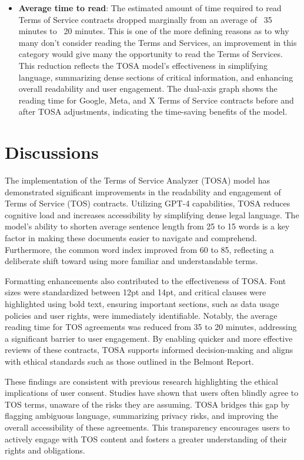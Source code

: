 \documentclass[sigconf, nonacm]{acmart}
\begin{document}
\begin{itemize}
\item \textbf{Average time to read}: The estimated amount of time required to read Terms of Service contracts dropped marginally from an average of ~35 minutes to ~20 minutes. This is one of the more defining reasons as to why many don't consider reading the Terms and Services, an improvement in this category would give many the opportunity to read the Terms of Services. This reduction reflects the TOSA model's effectiveness in simplifying language, summarizing dense sections of critical information, and enhancing overall readability and user engagement. The dual-axis graph shows the reading time for Google, Meta, and X Terms of Service contracts before and after TOSA adjustments, indicating the time-saving benefits of the model.
\end{itemize}

\section{Discussions}
The implementation of the Terms of Service Analyzer (TOSA) model has demonstrated significant improvements in the readability and engagement of Terms of Service (TOS) contracts. Utilizing GPT-4 capabilities, TOSA reduces cognitive load and increases accessibility by simplifying dense legal language. The model’s ability to shorten average sentence length from 25 to 15 words is a key factor in making these documents easier to navigate and comprehend. Furthermore, the common word index improved from 60 to 85, reflecting a deliberate shift toward using more familiar and understandable terms.

Formatting enhancements also contributed to the effectiveness of TOSA. Font sizes were standardized between 12pt and 14pt, and critical clauses were highlighted using bold text, ensuring important sections, such as data usage policies and user rights, were immediately identifiable. Notably, the average reading time for TOS agreements was reduced from 35 to 20 minutes, addressing a significant barrier to user engagement. By enabling quicker and more effective reviews of these contracts, TOSA supports informed decision-making and aligns with ethical standards such as those outlined in the Belmont Report.

These findings are consistent with previous research highlighting the ethical implications of user consent. Studies have shown that users often blindly agree to TOS terms, unaware of the risks they are assuming. TOSA bridges this gap by flagging ambiguous language, summarizing privacy risks, and improving the overall accessibility of these agreements. This transparency encourages users to actively engage with TOS content and fosters a greater understanding of their rights and obligations.
\end{document}
